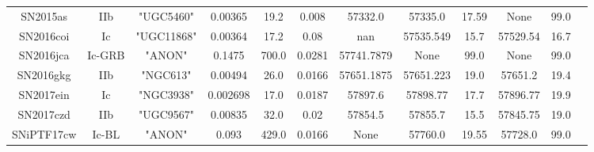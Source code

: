 \documentclass[onecolumn]{aa} %
\begin{document}
\begin{table*}
\begin{tabular}{cccccccccccc}
SN2015as&IIb&"UGC5460"&0.00365&19.2&0.008&57332.0&57335.0&17.59&None&99.0\\ 
SN2016coi&Ic&"UGC11868"&0.00364&17.2&0.08&nan&57535.549&15.7&57529.54&16.7\\ 
SN2016jca&Ic-GRB&"ANON"&0.1475&700.0&0.0281&57741.7879&None&99.0&None&99.0\\ 
SN2016gkg&IIb&"NGC613"&0.00494&26.0&0.0166&57651.1875&57651.223&19.0&57651.2&19.4\\ 
SN2017ein&Ic&"NGC3938"&0.002698&17.0&0.0187&57897.6&57898.77&17.7&57896.77&19.9\\ 
SN2017czd&IIb&"UGC9567"&0.00835&32.0&0.02&57854.5&57855.7&15.5&57845.75&19.0\\ 
SNiPTF17cw&Ic-BL&"ANON"&0.093&429.0&0.0166&None&57760.0&19.55&57728.0&99.0\\ 
\end{tabular}
\end{table*}
\end{document}
